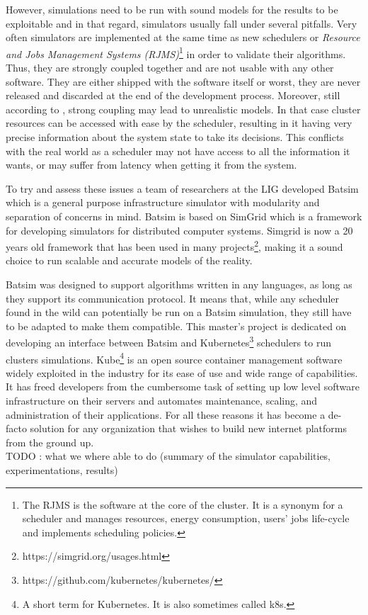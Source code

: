 However, simulations need to be run with sound models for the results to be
exploitable and in that regard, simulators usually fall under several
pitfalls\cite{poquet:tel-01757245}. Very often simulators are implemented at
the same time as new schedulers or \textit{Resource and Jobs Management
Systems (RJMS)}\footnote{The RJMS is the software at the core of the cluster. It is a
synonym for a scheduler and manages resources, energy consumption, users' jobs
life-cycle and implements scheduling policies.} in order to validate their
algorithms. Thus, they are strongly coupled together and are not usable with
any other software. They are either shipped with the software itself or worst,
they are never released and discarded at the end of the development process.
Moreover, still according to \cite{poquet:tel-01757245}, strong coupling may
lead to unrealistic models. In that case cluster resources can be accessed with
ease by the scheduler, resulting in it having very precise information about the
system state to take its decisions.  This conflicts with the real world as a
scheduler may not have access to all the information it wants, or may suffer
from latency when getting it from the system.\\

To try and assess these issues a team of researchers at the LIG developed
Batsim\cite{dutot:hal-01333471} which is a general purpose infrastructure
simulator with modularity and separation of concerns in mind. Batsim is based
on SimGrid\cite{casanova:hal-01017319} which is a framework for developing
simulators for distributed computer systems. Simgrid is now a 20 years old
framework that has been used in many
projects\footnote{https://simgrid.org/usages.html}, making it a sound choice to
run scalable and accurate models of the reality.



Batsim was designed to support algorithms written in any languages, as long as
they support its communication protocol. It means that, while any scheduler
found in the wild can potentially be run on a Batsim simulation, they still
have to be adapted to make them compatible. This master's project is dedicated
on developing an interface between Batsim and
Kubernetes\footnote{https://github.com/kubernetes/kubernetes/} schedulers 
to run clusters simulations. Kube\footnote{A short term for Kubernetes. It is also sometimes called k8s.} is an open source
container management software widely exploited in the industry for its ease of
use and wide range of capabilities. It has freed developers from the cumbersome
task of setting up low level software infrastructure on their servers and
automates maintenance, scaling, and administration of their applications. For
all these reasons it has become a de-facto solution for any organization that
wishes to build new internet platforms from the ground up.\\

TODO : what we where able to do (summary of the simulator capabilities,
experimentations, results)

